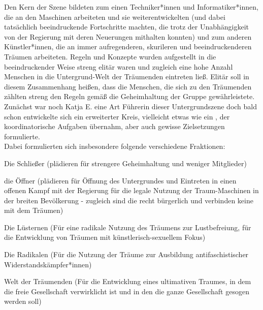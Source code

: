 \documentclass[12pt, a4paper, openany]{report}
\let\tempone\itemize
\let\temptwo\enditemize
\renewenvironment{itemize}{\tempone\addtolength{\itemsep}{-0.5\baselineskip}}{\temptwo}
\begin{document}
Den Kern der Szene bildeten zum einen Techniker*innen und Informatiker*innen, die an den Maschinen arbeiteten und sie weiterentwickelten (und dabei tatsächlich beeindruckende Fortschritte machten, die trotz der Unabhängigkeit von der Regierung mit deren Neuerungen mithalten konnten) und zum anderen Künstler*innen, die an immer aufregenderen, skurileren und beeindruckenderen Träumen arbeiteten. 
Regeln und Konzepte wurden aufgestellt in die beeindruckender Weise streng elitär waren und zugleich eine hohe Anzahl Menschen in die Untergrund-Welt der Träumenden eintreten ließ.
Elitär soll in diesem Zusammenhang heißen, dass die Menschen, die sich zu den Träumenden zählten streng den Regeln gemäß die Geheimhaltung der Gruppe gewährleistete. \\
Zunächst war noch Katja E. eine Art Führerin dieser Untergrundszene doch bald schon entwickelte sich ein erweiterter Kreis, vielleicht etwas wie ein , der koordinatorische Aufgaben übernahm, aber auch gewisse Zielsetzungen formulierte.\\
Dabei formulierten sich insbesondere folgende verschiedene Fraktionen:
\begin{itemize}
  \setlength\itemsep{0em}
  \item Die Schließer (plädieren für strengere Geheimhaltung und weniger Mitglieder)
  \item die Öffner (plädieren für Öffnung des Untergrundes und Eintreten in
    einen offenen Kampf mit der Regierung für die legale Nutzung der Traum-Maschinen 
    in der breiten Bevölkerung - zugleich sind die recht bürgerlich und verbinden keine 
     mit dem Träumen)
  \item Die Lüsternen (Für eine radikale Nutzung des Träumens zur Lustbefreiung, für die Entwicklung von Träumen mit künstlerisch-sexuellem Fokus)
  \item Die Radikalen (Für die Nutzung der Träume zur Ausbildung antifaschistischer Widerstandskämpfer*innen)
  \item Welt der Träumenden (Für die Entwicklung eines ultimativen Traumes, in dem die freie Gesellschaft verwirklicht ist und in den die ganze Gesellschaft gesogen werden soll)
\end{itemize}
\end{document}
